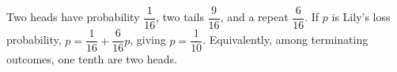 Two heads have probability $\dfrac{1}{16}$, two tails $\dfrac{9}{16}$, and a repeat $\dfrac{6}{16}$. If $p$ is Lily's loss probability, $p=\dfrac{1}{16}+\dfrac{6}{16}p$, giving $\boxed{p=\dfrac{1}{10}}$. Equivalently, among terminating outcomes, one tenth are two heads.

